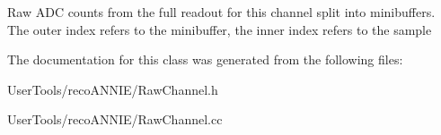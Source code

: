 Raw ADC counts from the full readout for this channel split into minibuffers. The outer index refers to the minibuffer, the inner index refers to the sample 

The documentation for this class was generated from the following files:\begin{DoxyCompactItemize}
\item 
UserTools/recoANNIE/RawChannel.h\item 
UserTools/recoANNIE/RawChannel.cc\end{DoxyCompactItemize}
